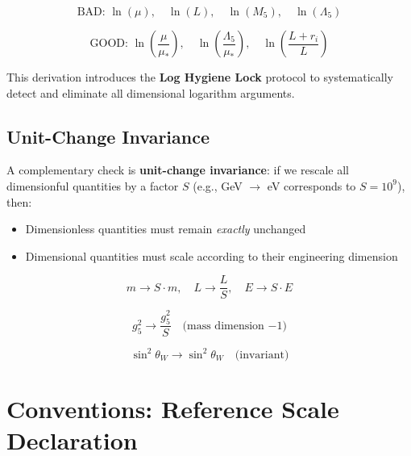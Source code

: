 \documentclass[11pt,a4paper]{article}
\theoremstyle{definition}
\begin{document}
\begin{equation}
\label{eq:intro_bad_log}
\text{BAD: } \ln(\mu), \quad \ln(L), \quad \ln(M_5), \quad \ln(\Lambda_5)
\end{equation}

\begin{equation}
\label{eq:intro_good_log}
\text{GOOD: } \ln\left(\frac{\mu}{\mu_*}\right), \quad \ln\left(\frac{\Lambda_5}{\mu_*}\right), \quad \ln\left(\frac{L + r_i}{L}\right)
\end{equation}

This derivation introduces the \textbf{Log Hygiene Lock} protocol to systematically
detect and eliminate all dimensional logarithm arguments.

\subsection{Unit-Change Invariance}
\label{subsec:unit_invariance_intro}

A complementary check is \textbf{unit-change invariance}: if we rescale all
dimensionful quantities by a factor $S$ (e.g., GeV $\to$ eV corresponds to
$S = 10^9$), then:
\begin{itemize}
\item Dimensionless quantities must remain \textit{exactly} unchanged
\item Dimensional quantities must scale according to their engineering dimension
\end{itemize}

\begin{equation}
\label{eq:unit_scale_mass}
m \to S \cdot m, \quad L \to \frac{L}{S}, \quad E \to S \cdot E
\end{equation}

\begin{equation}
\label{eq:unit_scale_coupling}
g_5^2 \to \frac{g_5^2}{S} \quad \text{(mass dimension $-1$)}
\end{equation}

\begin{equation}
\label{eq:unit_invariant_check}
\sin^2\theta_W \to \sin^2\theta_W \quad \text{(invariant)}
\end{equation}

\section{Conventions: Reference Scale Declaration}
\label{sec:reference_scale}
\end{document}
